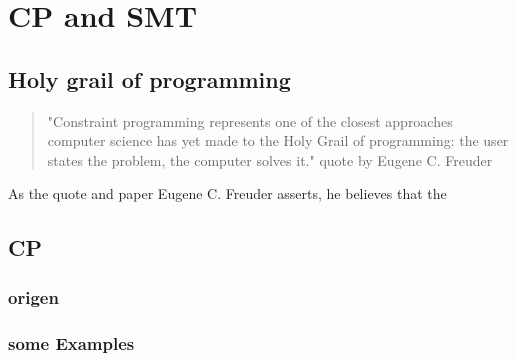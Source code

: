 \chapter{CP and SMT}
\label{cha:4}

\section{Holy grail of programming} %
\begin{quote}
	"Constraint programming represents one of the closest approaches computer science has yet made to the Holy Grail of programming: the user states the problem, the computer solves it." \cite{11freuder1997pursuitHolyGrail} quote by Eugene C. Freuder
\end{quote}
As the quote and paper Eugene C. Freuder asserts, he believes that the 




\section{CP}

\subsection{origen}

\subsection{some Examples}

